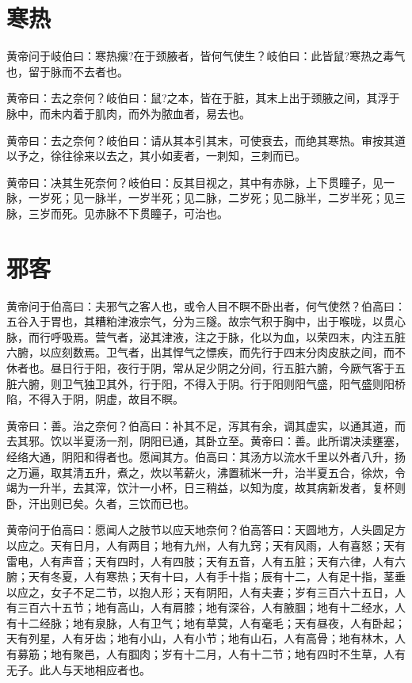 \documentclass[12pt,UTF8]{ctexbook}
\begin{document}
	\chapter{寒热}
	
	黄帝问于岐伯曰：寒热瘰?在于颈腋者，皆何气使生？岐伯曰：此皆鼠?寒热之毒气也，留于脉而不去者也。
	
	黄帝曰：去之奈何？岐伯曰：鼠?之本，皆在于脏，其末上出于颈腋之间，其浮于脉中，而未内着于肌肉，而外为脓血者，易去也。
	
	黄帝曰：去之奈何？岐伯曰：请从其本引其末，可使衰去，而绝其寒热。审按其道以予之，徐往徐来以去之，其小如麦者，一刺知，三刺而已。
	
	黄帝曰：决其生死奈何？岐伯曰：反其目视之，其中有赤脉，上下贯瞳子，见一脉，一岁死；见一脉半，一岁半死；见二脉，二岁死；见二脉半，二岁半死；见三脉，三岁而死。见赤脉不下贯瞳子，可治也。
	
	\chapter{邪客}
	
	黄帝问于伯高曰：夫邪气之客人也，或令人目不瞑不卧出者，何气使然？伯高曰：五谷入于胃也，其糟粕津液宗气，分为三隧。故宗气积于胸中，出于喉咙，以贯心脉，而行呼吸焉。营气者，泌其津液，注之于脉，化以为血，以荣四末，内注五脏六腑，以应刻数焉。卫气者，出其悍气之慓疾，而先行于四末分肉皮肤之间，而不休者也。昼日行于阳，夜行于阴，常从足少阴之分间，行五脏六腑，今厥气客于五脏六腑，则卫气独卫其外，行于阳，不得入于阴。行于阳则阳气盛，阳气盛则阳桥陷，不得入于阴，阴虚，故目不瞑。
	
	黄帝曰：善。治之奈何？伯高曰：补其不足，泻其有余，调其虚实，以通其道，而去其邪。饮以半夏汤一剂，阴阳已通，其卧立至。黄帝曰：善。此所谓决渎壅塞，经络大通，阴阳和得者也。愿闻其方。伯高曰：其汤方以流水千里以外者八升，扬之万遍，取其清五升，煮之，炊以苇薪火，沸置秫米一升，治半夏五合，徐炊，令竭为一升半，去其滓，饮汁一小杯，日三稍益，以知为度，故其病新发者，复杯则卧，汗出则已矣。久者，三饮而已也。
	
	黄帝问于伯高曰：愿闻人之肢节以应天地奈何？伯高答曰：天圆地方，人头圆足方以应之。天有日月，人有两目；地有九州，人有九窍；天有风雨，人有喜怒；天有雷电，人有声音；天有四时，人有四肢；天有五音，人有五脏；天有六律，人有六腑；天有冬夏，人有寒热；天有十曰，人有手十指；辰有十二，人有足十指，茎垂以应之，女子不足二节，以抱人形；天有阴阳，人有夫妻；岁有三百六十五日，人有三百六十五节；地有高山，人有肩膝；地有深谷，人有腋腘；地有十二经水，人有十二经脉；地有泉脉，人有卫气；地有草蓂，人有毫毛；天有昼夜，人有卧起；天有列星，人有牙齿；地有小山，人有小节；地有山石，人有高骨；地有林木，人有募筋；地有聚邑，人有腘肉；岁有十二月，人有十二节；地有四时不生草，人有无子。此人与天地相应者也。
	
\end{document}
